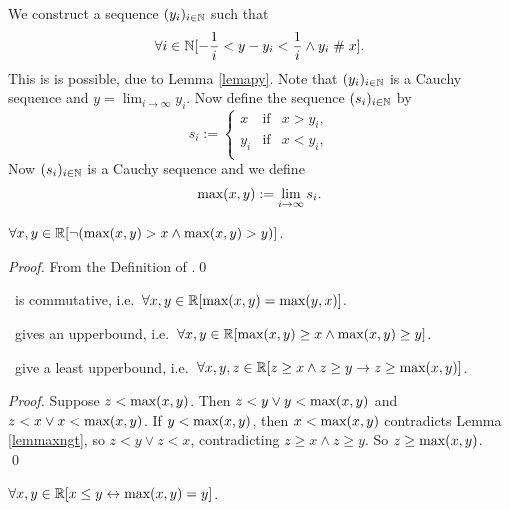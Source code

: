 \begin{definition}\label{defmax}
We construct a sequence $(y_i)_{i\in\mathbb{N}}$ such that
$$\forall i\in \mathbb{N}[-\frac{1}{i}< y-y_i <\frac{1}{i} \wedge y_i \mathrel{\#}
x].$$ This is is possible, due to Lemma \ref{lemapy}. Note that
$(y_i)_{i\in\mathbb{N}}$ is a Cauchy sequence and $y=\lim_{i\rightarrow \infty}
y_i$. Now define the sequence $(s_i)_{i\in\mathbb{N}}$ by
$$s_i :=
\left\{ \begin{array}{rcl}
        x &\mbox{if}& x>y_i,\\
        y_i &\mbox{if}& x<y_i,\\
       \end{array}\right.$$
Now $(s_i)_{i\in\mathbb{N}}$ is a Cauchy sequence and we define
$$\mbox{max} (x ,y) := \lim_{i\rightarrow \infty} s_i.$$
\end{definition}

\begin{lemma}\label{lemmaxngt}
$\forall x,y\in\mathbb{R}[\neg(\mbox{max}(x,y)>x \wedge \mbox{max}(x,y)>y)]$.
\end{lemma}
\begin{proof}
From the Definition of \maxx.\qed
\end{proof}

\begin{lemma}\label{lemmaxcomm}
\maxx\ is commutative, i.e.\ $\forall x,y\in\mathbb{R}[\mbox{max}(x,y)=\mbox{max}(y,x)]$.
\end{lemma}

\begin{lemma}\label{lemmaxisupb}
\maxx\ gives an upperbound, i.e.\ $\forall x,y\in\mathbb{R}[\mbox{max}(x,y)\geq x 
\wedge \mbox{max}(x,y)\geq y]$.
\end{lemma}

\begin{lemma}\label{lemmaxislub}
\maxx\ give a least upperbound, i.e.\ $\forall x,y,z\in\mathbb{R}[z\geq x 
\wedge z\geq y \rightarrow z\geq\mbox{max}(x,y)]$. 
\end{lemma}

\begin{proof}
Suppose $z< \mbox{max}(x,y)$. Then  $z<y \vee y<\mbox{max}(x,y)$ and 
$z<x \vee x<\mbox{max}(x,y)$. If $y<\mbox{max}(x,y)$, then $x<\mbox{max}(x,y)$ 
contradicts Lemma \ref{lemmaxngt}, so $z<y\vee z<x$, contradicting 
$z\geq x \wedge z\geq y$. So $z\geq\mbox{max}(x,y)$.
\qed
\end{proof}

\begin{lemma} \label{lemmaxgeq}
$\forall x,y\in\mathbb{R}[ x\leq y \leftrightarrow \mbox{max}(x,y) = y]$.
\end{lemma}


